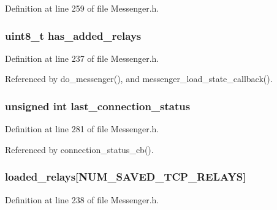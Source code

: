 Definition at line 259 of file Messenger.\+h.

\hypertarget{struct_messenger_af97bc78d4a1b6b87167a479a1cb9920c}{
\subsubsection[{has\+\_\+added\+\_\+relays}]{\setlength{\rightskip}{0pt plus 5cm}uint8\+\_\+t has\+\_\+added\+\_\+relays}}\label{struct_messenger_af97bc78d4a1b6b87167a479a1cb9920c}


Definition at line 237 of file Messenger.\+h.



Referenced by do\+\_\+messenger(), and messenger\+\_\+load\+\_\+state\+\_\+callback().

\hypertarget{struct_messenger_a97e16f5111643baf9c4f055af6b90e8c}{
\subsubsection[{last\+\_\+connection\+\_\+status}]{\setlength{\rightskip}{0pt plus 5cm}unsigned int last\+\_\+connection\+\_\+status}}\label{struct_messenger_a97e16f5111643baf9c4f055af6b90e8c}


Definition at line 281 of file Messenger.\+h.



Referenced by connection\+\_\+status\+\_\+cb().

\hypertarget{struct_messenger_a75d4e8cfc84896f1684dd7c62c1be397}{
\subsubsection[{loaded\+\_\+relays}]{ loaded\+\_\+relays\mbox{[}{\bf N\+U\+M\+\_\+\+S\+A\+V\+E\+D\+\_\+\+T\+C\+P\+\_\+\+R\+E\+L\+A\+Y\+S}\mbox{]}}}\label{struct_messenger_a75d4e8cfc84896f1684dd7c62c1be397}


Definition at line 238 of file Messenger.\+h.



